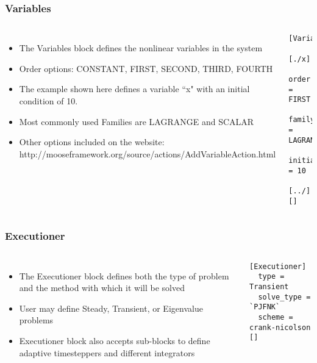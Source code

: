 	\begin{frame}[fragile]
		\frametitle{Variables}
		\begin{columns}
			\begin{itemize}
				\item The Variables block defines the nonlinear variables in the system
				\item Order options: CONSTANT, FIRST, SECOND, THIRD, FOURTH
				\item The example shown here defines a variable ``x" with an initial condition of 10.
				\item Most commonly used Families are LAGRANGE and SCALAR
				\item Other options included on the website: http://mooseframework.org/source/actions/AddVariableAction.html
			\end{itemize}
			\begin{Verbatim}[fontsize=\large]
[Variables]
  [./x]
    order = FIRST
    family = LAGRANGE
    initial_condition = 10
  [../]
[]
			\end{Verbatim}
		\end{columns}
	\end{frame}

	\begin{frame}[fragile]
		\frametitle{Executioner}
		\begin{columns}
			\column{0.5\textwidth}
			\begin{itemize}
				\item The Executioner block defines both the type of problem and the method with which it will be solved
				\item User may define Steady, Transient, or Eigenvalue problems
				\item Executioner block also accepts sub-blocks to define adaptive timesteppers and different integrators
			\end{itemize}
			\column{0.5\textwidth}
			\begin{Verbatim}[fontsize=\small]
[Executioner]
  type = Transient
  solve_type = `PJFNK`
  scheme = crank-nicolson
[]
			\end{Verbatim}
		\end{columns}
	\end{frame}

